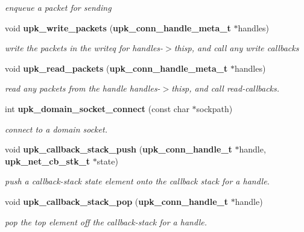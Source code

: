 \begin{DoxyCompactItemize}
\begin{DoxyCompactList}\small\item\em enqueue a packet for sending \end{DoxyCompactList}\item 
void {\bf upk\_\-write\_\-packets} ({\bf upk\_\-conn\_\-handle\_\-meta\_\-t} $\ast$handles)
\begin{DoxyCompactList}\small\item\em write the packets in the writeq for handles-\/$>$thisp, and call any write callbacks \end{DoxyCompactList}\item 
void {\bf upk\_\-read\_\-packets} ({\bf upk\_\-conn\_\-handle\_\-meta\_\-t} $\ast$handles)
\begin{DoxyCompactList}\small\item\em read any packets from the handle handles-\/$>$thisp, and call read-\/callbacks. \end{DoxyCompactList}\item 
int {\bf upk\_\-domain\_\-socket\_\-connect} (const char $\ast$sockpath)
\begin{DoxyCompactList}\small\item\em connect to a domain socket. \end{DoxyCompactList}\item 
void {\bf upk\_\-callback\_\-stack\_\-push} ({\bf upk\_\-conn\_\-handle\_\-t} $\ast$handle, {\bf upk\_\-net\_\-cb\_\-stk\_\-t} $\ast$state)
\begin{DoxyCompactList}\small\item\em push a callback-\/stack state element onto the callback stack for a handle. \end{DoxyCompactList}\item 
void {\bf upk\_\-callback\_\-stack\_\-pop} ({\bf upk\_\-conn\_\-handle\_\-t} $\ast$handle)
\begin{DoxyCompactList}\small\item\em pop the top element off the callback-\/stack for a handle. \end{DoxyCompactList}\end{DoxyCompactItemize}


